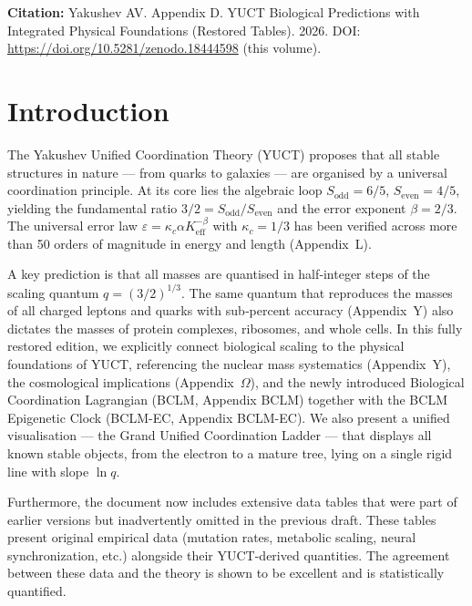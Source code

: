 \documentclass[11pt,a4paper]{article}
\begin{document}
	\vspace{0.1cm}
	\noindent
	\textbf{Citation:} Yakushev AV. Appendix D. YUCT Biological Predictions with Integrated Physical Foundations (Restored Tables). 2026. DOI: \url{https://doi.org/10.5281/zenodo.18444598} (this volume).
	
	\tableofcontents
	\newpage
	
	\section{Introduction}
	
	The Yakushev Unified Coordination Theory (YUCT) proposes that all stable structures in nature — from quarks to galaxies — are organised by a universal coordination principle. At its core lies the algebraic loop \(S_{\mathrm{odd}} = 6/5\), \(S_{\mathrm{even}} = 4/5\), yielding the fundamental ratio \(3/2 = S_{\mathrm{odd}}/S_{\mathrm{even}}\) and the error exponent \(\beta = 2/3\). The universal error law \(\varepsilon = \kappa_c \alpha K_{\mathrm{eff}}^{-\beta}\) with \(\kappa_c = 1/3\) has been verified across more than 50 orders of magnitude in energy and length (Appendix~L).
	
	A key prediction is that all masses are quantised in half‑integer steps of the scaling quantum \(q = (3/2)^{1/3}\). The same quantum that reproduces the masses of all charged leptons and quarks with sub‑percent accuracy (Appendix~Y) also dictates the masses of protein complexes, ribosomes, and whole cells. In this fully restored edition, we explicitly connect biological scaling to the physical foundations of YUCT, referencing the nuclear mass systematics (Appendix~Y), the cosmological implications (Appendix~\(\Omega\)), and the newly introduced Biological Coordination Lagrangian (BCLM, Appendix BCLM) together with the BCLM Epigenetic Clock (BCLM-EC, Appendix BCLM-EC). We also present a unified visualisation — the Grand Unified Coordination Ladder — that displays all known stable objects, from the electron to a mature tree, lying on a single rigid line with slope \(\ln q\).
	
	Furthermore, the document now includes extensive data tables that were part of earlier versions but inadvertently omitted in the previous draft. These tables present original empirical data (mutation rates, metabolic scaling, neural synchronization, etc.) alongside their YUCT-derived quantities. The agreement between these data and the theory is shown to be excellent and is statistically quantified.
	
\end{document}
